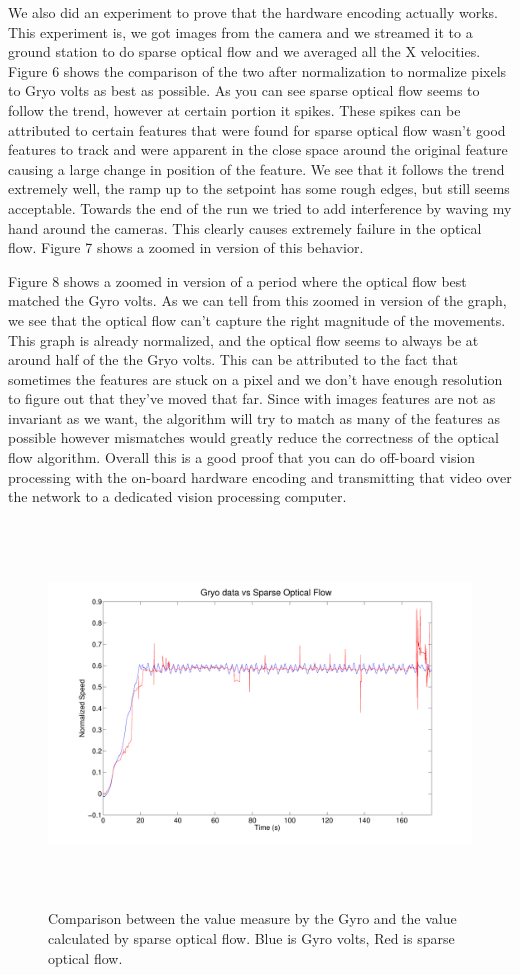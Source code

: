 \documentclass[conference, onecolumn, 12pt]{IEEEtran}
\begin{document}
We also did an experiment to prove that the hardware encoding actually works. This experiment is, we got images from the camera and we streamed it to a ground station to do sparse optical flow and we averaged all the X velocities. Figure 6 shows the comparison of the two after normalization to normalize pixels to Gryo volts as best as possible. As you can see sparse optical flow seems to follow the trend, however at certain portion it spikes. These spikes can be attributed to certain features that were found for sparse optical flow wasn't good features to track and were apparent in the close space around the original feature causing a large change in position of the feature. We see that it follows the trend extremely well, the ramp up to the setpoint has some rough edges, but still seems acceptable. Towards the end of the run we tried to add interference by waving my hand around the cameras. This clearly causes extremely failure in the optical flow. Figure 7 shows a zoomed in version of this behavior. 

Figure 8 shows a zoomed in version of a period where the optical flow best matched the Gyro volts. As we can tell from this zoomed in version of the graph, we see that the optical flow can't capture the right magnitude of the movements. This graph is already normalized, and the optical flow seems to always be at around half of the the Gryo volts. This can be attributed to the fact that sometimes the features are stuck on a pixel and we don't have enough resolution to figure out that they've moved that far. Since with images features are not as invariant as we want, the algorithm will try to match as many of the features as possible however mismatches would greatly reduce the correctness of the optical flow algorithm. Overall this is a good proof that you can do off-board vision processing with the on-board hardware encoding and transmitting that video over the network to a dedicated vision processing computer.

\begin{figure}
\centering
\includegraphics[height=4in]{fulltestcomp.pdf}
\caption{Comparison between the value measure by the Gyro and the value calculated by sparse optical flow. Blue is Gyro volts, Red is sparse optical flow.}
\end{figure}
\end{document}

